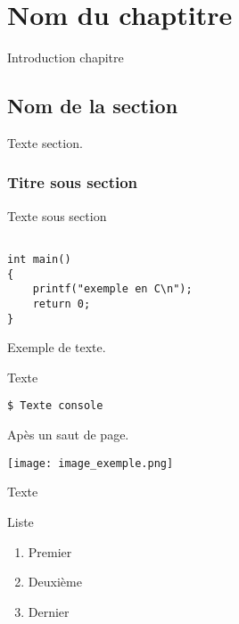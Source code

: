 
\chapter{Nom du chaptitre} %

\label{Chapitre 2} %


Introduction chapitre

\section{Nom de la section}

Texte section.
\subsection{Titre sous section}
Texte sous section
\begin{lstlisting}[frame=single,style=C]  % Start your code-block

int main()
{
	printf("exemple en C\n");
	return 0;
}
\end{lstlisting}


Exemple de texte.


%

Texte
\begin{lstlisting}[frame=single,style=Console]
$ Texte console
\end{lstlisting}
\pagebreak Apès un saut de page.


\begin{center} 
\hspace{12.45cm}
\texttt{[image: image\_exemple.png]}
\end{center}
\vspace{1cm}

Texte

Liste
\begin{enumerate}
\item Premier
\item Deuxième
\item Dernier
\end{enumerate}


 


